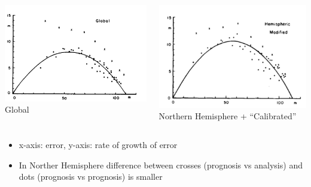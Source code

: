 \documentclass[aspectratio=169]{beamer}
\begin{document}
\begin{frame}

\begin{columns}[c]
\begin{center}
\includegraphics[height = 0.5\textheight]{figures/lorenz_atmospheric_1982_fig2}
Global
\end{center}
    \pause
    \begin{center}
\begin{center}
\includegraphics[height = 0.5\textheight]{figures/lorenz_atmospheric_1982_fig4}
Northern Hemisphere + ``Calibrated''
\end{center}
    \end{center}
\end{columns}

\begin{itemize}
\item x-axis: error, y-axis: rate of growth of error
\pause
\item In Norther Hemisphere difference between crosses (prognosis vs analysis) and dots (prognosis vs prognosis) is smaller
\end{itemize}

\end{frame}
\end{document}
